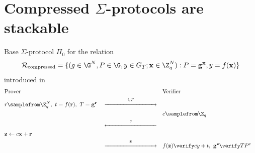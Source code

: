 \section{Compressed $\Sigma$-protocols are stackable}
\begin{protocol}[label={prot:compressed-sigs}]{Base $\Sigma$-protocol $\Pi_0$ for the relation 
$$\mathcal R_{\text{compressed}} = \{(g \in \G^N, P \in \G, y \in G_T; \mathbf{x} \in \Z_q^N): P = \mathbf{g^x}, y = f(\mathbf{x})\}$$ introduced in \cite{attema}} 
   \vspace{-0.5cm}
   \begin{align*}
       &\text{Prover}& 
       &&
       &\text{Verifier}& 
       \\
       &r \samplefrom \Z_q^N,\ t = f(\mathbf{r}),\ T = \mathbf{g^r}&
       &\overset  {t, T} {\xrightarrow{\hspace{3cm}}}&
       && 
       \\
       &&
       &&
       &c \samplefrom \Z_q&
       \\
       &&
       &\overset c {\xleftarrow{\hspace{3cm}}}&
       &&
       \\
       &\mathbf{z} \leftarrow c\mathbf{x} + \mathbf{r}&
       &&
       &&
       \\
       &&
       &\overset {\mathbf{z}} {\xrightarrow{\hspace{3cm}}}&
       &f(\mathbf{z}) \verify cy + t, \ \mathbf{g^z} \verify TP^c&
   \end{align*}
   \label{prot:base-compressed}
\end{protocol}